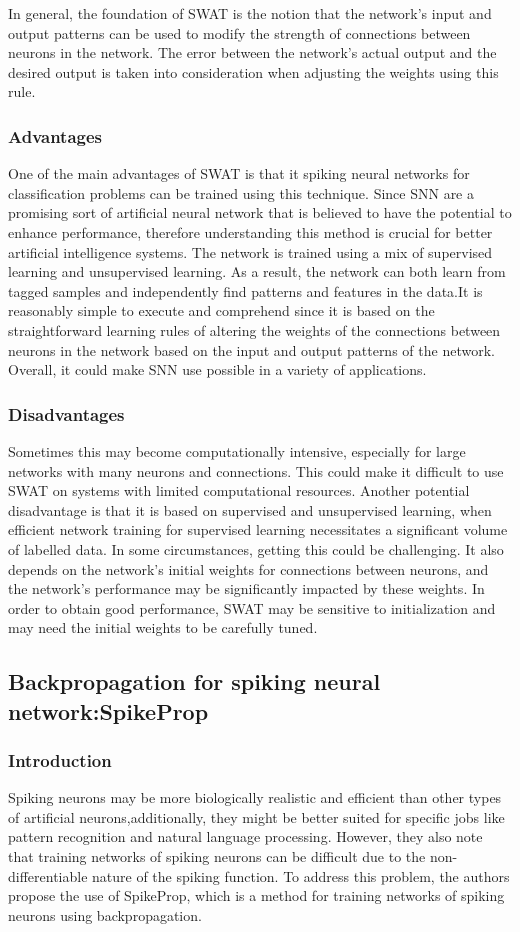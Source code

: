 In general, the foundation of SWAT is the notion that the network's input and
output patterns can be used to modify the strength of connections between
neurons in the network. The error between the network's actual output and the
desired output is taken into consideration when adjusting the weights using
this rule.
\subsubsection{Advantages}
One of the main advantages of SWAT is that it spiking neural networks for
classification problems can be trained using this technique. Since SNN are a
promising sort of artificial neural network that is believed to have the
potential to enhance performance, therefore understanding this method is
crucial for better artificial intelligence systems. The network is trained
using a mix of supervised learning and unsupervised learning. As a result, the
network can both learn from tagged samples and independently find patterns and
features in the data.It is reasonably simple to execute and comprehend since it
is based on the straightforward learning rules of altering the weights of the
connections between neurons in the network based on the input and output
patterns of the network. Overall, it could make SNN use possible in a variety
of applications.
\subsubsection{Disadvantages}
Sometimes this may become computationally intensive, especially for large
networks with many neurons and connections. This could make it difficult to use
SWAT on systems with limited computational resources. Another potential
disadvantage is that it is based on supervised and unsupervised learning, when
efficient network training for supervised learning necessitates a significant
volume of labelled data. In some circumstances, getting this could be
challenging. It also depends on the network's initial weights for connections
between neurons, and the network's performance may be significantly impacted by
these weights. In order to obtain good performance, SWAT may be sensitive to
initialization and may need the initial weights to be carefully tuned.

\subsection{Backpropagation for spiking neural network:SpikeProp}
\subsubsection{Introduction}
Spiking neurons may be more biologically realistic and efficient than other
types of artificial neurons,additionally, they might be better suited for
specific jobs like pattern recognition and natural language processing.
However, they also note that training networks of spiking neurons can be
difficult due to the non-differentiable nature of the spiking function. To
address this problem, the authors propose the use of SpikeProp\cite{spikeprop},
which is a method for training networks of spiking neurons using
backpropagation.
